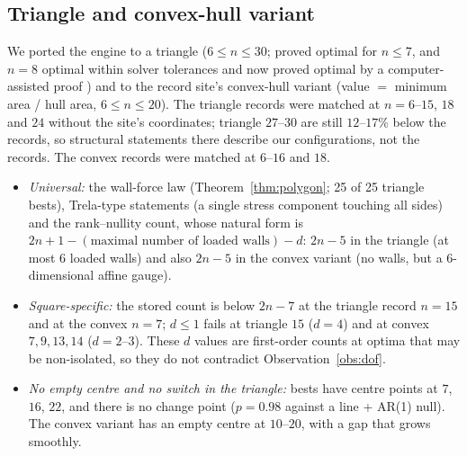 \documentclass[11pt]{amsart}
\theoremstyle{definition}
\begin{document}
\subsection{Triangle and convex-hull variant}
We ported the engine to a triangle ($6 \le n \le 30$; proved optimal for $n \le 7$, and $n = 8$ optimal within solver tolerances \cite{SMtri} and now proved optimal by a computer-assisted proof \cite{N8tri}) and to the record site's convex-hull variant (value $=$ minimum area / hull area, $6 \le n \le 20$). The triangle records were matched at $n = 6$--$15$, $18$ and $24$ without the site's coordinates; triangle $27$--$30$ are still $12$--$17\%$ below the records, so structural statements there describe our configurations, not the records. The convex records were matched at $6$--$16$ and $18$. %
\begin{itemize}
\item \emph{Universal:} the wall-force law (Theorem~\ref{thm:polygon}; 25 of 25 triangle bests), Trela-type statements (a single stress component touching all sides) and the rank--nullity count, whose natural form is $2n+1-(\text{maximal number of loaded walls})-d$: $2n-5$ in the triangle (at most 6 loaded walls) and also $2n-5$ in the convex variant (no walls, but a 6-dimensional affine gauge). %
\item \emph{Square-specific:} the stored count is below $2n-7$ at the triangle record $n = 15$ and at the convex $n = 7$; $d \le 1$ fails at triangle $15$ ($d = 4$) and at convex $7, 9, 13, 14$ ($d = 2$--$3$). These $d$ values are first-order counts at optima that may be non-isolated, so they do not contradict Observation~\ref{obs:dof}. %
\item \emph{No empty centre and no switch in the triangle:} bests have centre points at $7$, $16$, $22$, and there is no change point ($p = 0.98$ against a line + AR(1) null). The convex variant has an empty centre at $10$--$20$, with a gap that grows smoothly. %
\end{itemize}
\end{document}

